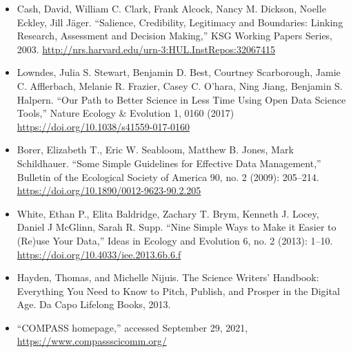 \documentclass[
]{book}
\providecommand{\tightlist}{%
  \setlength{\itemsep}{0pt}\setlength{\parskip}{0pt}}
\begin{document}
\begin{itemize}
\tightlist
\item
  Cash, David, William C. Clark, Frank Alcock, Nancy M. Dickson, Noelle Eckley, Jill Jäger. ``Salience, Credibility, Legitimacy and Boundaries: Linking Research, Assessment and Decision Making,'' KSG Working Papers Series, 2003. \url{http://nrs.harvard.edu/urn-3:HUL.InstRepos:32067415}
\item
  Lowndes, Julia S. Stewart, Benjamin D. Best, Courtney Scarborough, Jamie C. Afflerbach, Melanie R. Frazier, Casey C. O'hara, Ning Jiang, Benjamin S. Halpern. ``Our Path to Better Science in Less Time Using Open Data Science Tools,'' Nature Ecology \& Evolution 1, 0160 (2017) \url{https://doi.org/10.1038/s41559-017-0160}
\item
  Borer, Elizabeth T., Eric W. Seabloom, Matthew B. Jones, Mark Schildhauer. ``Some Simple Guidelines for Effective Data Management,'' Bulletin of the Ecological Society of America 90, no. 2 (2009): 205--214. \url{https://doi.org/10.1890/0012-9623-90.2.205}
\item
  White, Ethan P., Elita Baldridge, Zachary T. Brym, Kenneth J. Locey, Daniel J McGlinn, Sarah R. Supp. ``Nine Simple Ways to Make it Easier to (Re)use Your Data,'' Ideas in Ecology and Evolution 6, no. 2 (2013): 1--10. \url{https://doi.org/10.4033/iee.2013.6b.6.f}
\item
  Hayden, Thomas, and Michelle Nijuis. The Science Writers' Handbook: Everything You Need to Know to Pitch, Publish, and Prosper in the Digital Age. Da Capo Lifelong Books, 2013.
\item
  ``COMPASS homepage,'' accessed September 29, 2021, \url{https://www.compassscicomm.org/}
\end{itemize}
\end{document}

